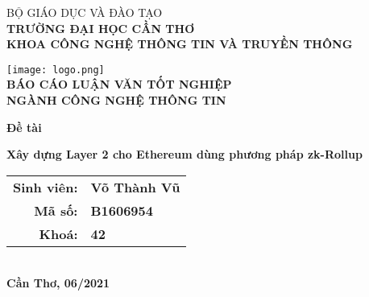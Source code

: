 \documentclass[../thesis.tex]{subfiles}
\begin{document}
\begin{titlepage}

\begin{center}

BỘ GIÁO DỤC VÀ ĐÀO TẠO\\
\textbf{TRƯỜNG ĐẠI HỌC CẦN THƠ\\}
\textbf{KHOA CÔNG NGHỆ THÔNG TIN VÀ TRUYỀN THÔNG\\[1cm]}

\texttt{[image: logo.png]}\\[1cm]

\textbf{BÁO CÁO LUẬN VĂN TỐT NGHIỆP\\}
\textbf{NGÀNH CÔNG NGHỆ THÔNG TIN\\[2cm]}

\begin{large}
\textbf{Đề tài\\[0.5cm]}
\end{large}
\textbf{{\LARGE Xây dựng Layer 2 cho Ethereum dùng phương pháp zk-Rollup}}
\\[4cm]

\begin{tabular}{ r l }
\textbf{Sinh viên:} & \textbf{Võ Thành Vũ}\\ 
\textbf{Mã số:} & \textbf{B1606954}\\  
\textbf{Khoá:} & \textbf{42}   
\end{tabular}
\\[4cm]

\textbf{Cần Thơ, 06/2021}

\end{center}

\end{titlepage}
\end{document}
